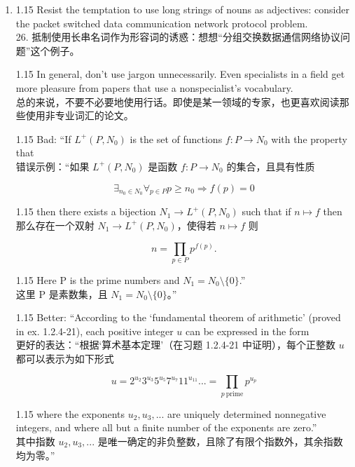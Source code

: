\documentclass[12pt,a4paper]{article}
\newcommand{\bilingual}[2]{
    \begin{spacing}{1.15} %
        \noindent \normalsize #1 \\[-0.5ex] %
        \small \textcolor{blue!70!black}{#2} %
    \end{spacing}
    \vspace{0.8em} %
}
\begin{document}
\begin{enumerate}
\item \bilingual{Resist the temptation to use long strings of nouns as adjectives: consider the packet switched data communication network protocol problem.}{26. 抵制使用长串名词作为形容词的诱惑：想想“分组交换数据通信网络协议问题”这个例子。} %
\bilingual{In general, don't use jargon unnecessarily. Even specialists in a field get more pleasure from papers that use a nonspecialist's vocabulary.}{总的来说，不要不必要地使用行话。即使是某一领域的专家，也更喜欢阅读那些使用非专业词汇的论文。} %
\bilingual{Bad: ``If $L^{+}(P,N_{0})$ is the set of functions $f:P\rightarrow N_{0}$ with the property that}{错误示例：“如果 $L^{+}(P,N_{0})$ 是函数 $f:P\rightarrow N_{0}$ 的集合，且具有性质} %
\begin{equation*}
    \exists_{n_{0}\in N_{0}}\forall_{p\in P}p\ge n_{0}\Rightarrow f(p)=0
\end{equation*} %
\bilingual{then there exists a bijection $N_{1}\rightarrow L^{+}(P,N_{0})$ such that if $n\mapsto f$ then}{那么存在一个双射 $N_{1}\rightarrow L^{+}(P,N_{0})$，使得若 $n\mapsto f$ 则} %
\begin{equation*}
    n=\prod_{p\in P}p^{f(p)}.
\end{equation*} %
\bilingual{Here P is the prime numbers and $N_{1}=N_{0}\setminus\{0\}$.''}{这里 P 是素数集，且 $N_{1}=N_{0}\setminus\{0\}$。”} %
\bilingual{Better: ``According to the `fundamental theorem of arithmetic' (proved in ex. 1.2.4-21), each positive integer $u$ can be expressed in the form}{更好的表达：“根据‘算术基本定理’（在习题 1.2.4-21 中证明），每个正整数 $u$ 都可以表示为如下形式} %
\begin{equation*}
    u=2^{u_{2}}3^{u_{3}}5^{u_{5}}7^{u_{7}}11^{u_{11}}...=\prod_{p~\text{prime}}p^{u_{p}}
\end{equation*} %
\bilingual{where the exponents $u_{2},u_{3},...$ are uniquely determined nonnegative integers, and where all but a finite number of the exponents are zero.''}{其中指数 $u_{2},u_{3},...$ 是唯一确定的非负整数，且除了有限个指数外，其余指数均为零。”} %


\end{enumerate}
\end{document}
